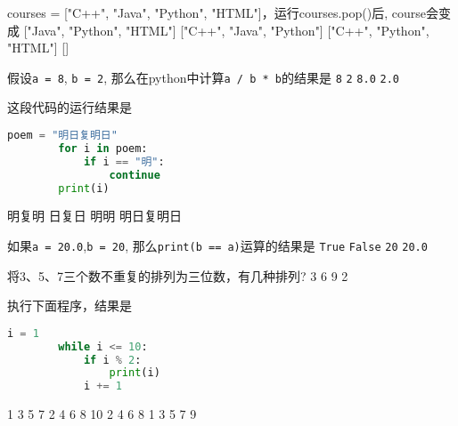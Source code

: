 \documentclass[hideanswer=true,
enfont=empty,	%
zhfont=empty,	%
mathfont=newtxmath,
]{cmcthesis}
\begin{document}
\begin{problem}
	courses = ["C++", "Java", "Python", "HTML"]，运行courses.pop()后, course会变成  
	\options
	{["Java", "Python", "HTML"]}
	{["C++", "Java", "Python"]}
	{["C++", "Python", "HTML"]}
	{[]}
\end{problem}

\begin{problem}
	假设\texttt{a = 8}, \texttt{b = 2}, 那么在python中计算\texttt{a / b * b}的结果是          
	\options
	{\texttt{8}          }
	{\texttt{2}                     }
	{\texttt{8.0}                     }
	{\texttt{2.0}                     }
\end{problem}

\begin{problem}
	这段代码的运行结果是          
	\begin{lstlisting}[style=tex, language=python]
		poem = "明日复明日"
		for i in poem:
		    if i == "明":
		        continue
		print(i)
	\end{lstlisting}

	\options
	{ 明复明       }
	{ 日复日                     }
	{ 明明                     }
	{ 明日复明日           }
\end{problem}

\begin{problem}
	如果\texttt{a = 20.0},\texttt{b = 20}, 那么\texttt{print(b == a)}运算的结果是          
	\options
	{\texttt{True}                     }
	{\texttt{False}                     }
	{\texttt{20}                     }
	{\texttt{20.0}                     }

\end{problem}

\begin{problem}
	将3、5、7三个数不重复的排列为三位数，有几种排列?         
	\options
	{\texttt{}         3            }
	{\texttt{}        6             }
	{\texttt{}         9            }
	{\texttt{}          2           }
\end{problem}

\begin{problem}
	执行下面程序，结果是          
	\begin{lstlisting}[style=tex, language=python]
		i = 1
		while i <= 10:
		    if i % 2:
				print(i)
			i += 1
	\end{lstlisting}
	
	\options
	{ 1 3 5 7       }
	{ 2 4 6 8 10                  }
	{ 2 4 6 8                      }
	{ 1 3 5 7 9        }
\end{problem}
\end{document}
